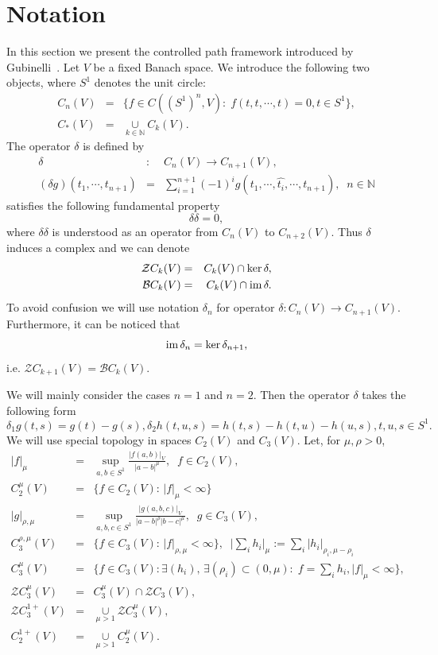 \documentclass[11pt,a4paper,leqno]{amsart}%
\theoremstyle{plain}
\theoremstyle{remark}
\theoremstyle{plain}
\numberwithin{equation}{section}
\def\Nat{{\mathbb N}}
\def\im{\mbox{im\,}}
\def\suml{\sum\limits}
\def\supl{\sup\limits}
\def\cupl{\mathop{\cup}\limits}
\def\supl{\mathop{\sup}\limits}
\begin{document}
\section{Notation}
In this section we present the controlled path framework introduced by Gubinelli~\cite{[Gubinelli-2004]}.
Let $V$ be a fixed Banach space. We introduce  the following two objects, where $S^1$ denotes the unit circle:
\begin{eqnarray*}
C_n(V)&=&\{f\in C((S^1)^n,V):\; f(t,t,\cdots,t)=0,t\in
S^1\},\\
C_*(V)&=&\cupl_{k\in\Nat}C_k(V).
\end{eqnarray*}
The operator $\delta$ is defined by 
\begin{eqnarray*}
\delta&:&C_n(V)\to C_{n+1}(V),\\
(\delta g)(t_1,\cdots,t_{n+1})&=&\suml_{i=1}^{n+1}(-1)^ig(t_1,\cdots,\hat{t_i},\cdots,t_{n+1}),\;\; n\in\Nat
\end{eqnarray*}
satisfies the following fundamental property
$$
\delta\delta=0,
$$
where $\delta\delta$ is understood as an operator from $C_n(V)$ to
$C_{n+2}(V)$. Thus $\delta$ induces a complex and we can denote
\begin{eqnarray*}
\mathcal{Z}C_k(V)&=&C_k(V)\cap\ker\delta,\\
\mathcal{B}C_k(V)&=&C_k(V)\cap\im\delta.
\end{eqnarray*}
To avoid confusion we will use notation $\delta_n$ for operator
$\delta:C_n(V)\to C_{n+1}(V)$. Furthermore, it can be noticed that
$$
\im\delta_n=\ker\delta_{n+1},
$$
i.e. $\mathcal{Z}C_{k+1}(V)=\mathcal{B}C_k(V)$.

We will  mainly consider the cases $n=1$ and $n=2$. Then the operator $\delta$
takes the following form
$$
\delta_1g(t,s)=g(t)-g(s),\delta_2h(t,u,s)=h(t,s)-h(t,u)-h(u,s),t,u,s\in
S^1.
$$
We will use special topology in spaces $C_2(V)$ and $C_3(V)$.
Let, for $\mu,\rho>0$, 
\begin{eqnarray*}
\vert f\vert_{\mu}&=&\supl_{a,b\in S^1}\frac{\vert f(a,b)\vert_{V}}{\vert a-b\vert^{\mu}},\;\;f\in
C_2(V),
\\
C_2^{\mu}(V)&=&\{f\in C_2(V):\, \vert f\vert_{\mu}<\infty\}
\\
\vert g\vert_{\rho,\mu}&=&\supl_{a,b,c\in
S^1}\frac{\vert g(a,b,c)\vert_{V}}{\vert a-b\vert^{\rho}\vert b-c\vert^{\mu}},\;\;g\in
C_3(V),
\\
C_3^{\rho,\mu}(V)&=&\{f\in C_3(V):\, \vert f\vert_{\rho,\mu}<\infty\},\;\; \vert \suml_ih_i\vert_{\mu}:=\suml_i\vert h_i\vert_{\rho_i,\mu-\rho_i}
\\
C_3^{\mu}(V)&=&\{f\in
C_3(V): \exists (h_i), \, \exists (\rho_i)\subset (0,\mu):\;  f=\suml_ih_i,\vert f\vert_{\mu}<\infty\},
\\
\mathcal{Z}C_3^{\mu}(V)&=&C_3^{\mu}(V)\cap\mathcal{Z}C_3(V),
\\
\mathcal{Z}C_3^{1+}(V)&=&\cupl_{\mu>1}\mathcal{Z}C_3^{\mu}(V),\\
C_2^{1+}(V)&=&\cupl_{\mu>1}C_2^{\mu}(V).
\end{eqnarray*}
\end{document}
